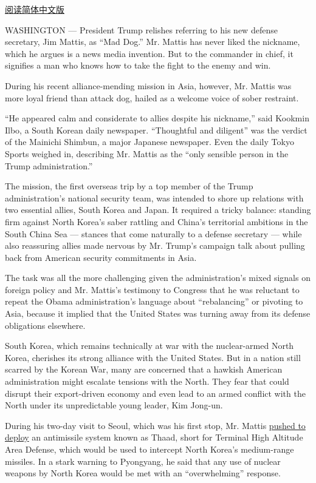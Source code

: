\href{http://cn.nytimes.com/asia-pacific/20170206/jim-mattis-south-korea-japan/}{阅读简体中文版}

WASHINGTON --- President Trump relishes referring to his new defense
secretary, Jim Mattis, as ``Mad Dog.'' Mr. Mattis has never liked the
nickname, which he argues is a news media invention. But to the
commander in chief, it signifies a man who knows how to take the fight
to the enemy and win.

During his recent alliance-mending mission in Asia, however, Mr. Mattis
was more loyal friend than attack dog, hailed as a welcome voice of
sober restraint.

``He appeared calm and considerate to allies despite his nickname,''
said Kookmin Ilbo, a South Korean daily newspaper. ``Thoughtful and
diligent'' was the verdict of the Mainichi Shimbun, a major Japanese
newspaper. Even the daily Tokyo Sports weighed in, describing Mr. Mattis
as the ``only sensible person in the Trump administration.''

The mission, the first overseas trip by a top member of the Trump
administration's national security team, was intended to shore up
relations with two essential allies, South Korea and Japan. It required
a tricky balance: standing firm against North Korea's saber rattling and
China's territorial ambitions in the South China Sea --- stances that
come naturally to a defense secretary --- while also reassuring allies
made nervous by Mr. Trump's campaign talk about pulling back from
American security commitments in Asia.

The task was all the more challenging given the administration's mixed
signals on foreign policy and Mr. Mattis's testimony to Congress that he
was reluctant to repeat the Obama administration's language about
``rebalancing'' or pivoting to Asia, because it implied that the United
States was turning away from its defense obligations elsewhere.

South Korea, which remains technically at war with the nuclear-armed
North Korea, cherishes its strong alliance with the United States. But
in a nation still scarred by the Korean War, many are concerned that a
hawkish American administration might escalate tensions with the North.
They fear that could disrupt their export-driven economy and even lead
to an armed conflict with the North under its unpredictable young
leader, Kim Jong-un.

During his two-day visit to Seoul, which was his first stop, Mr. Mattis
\href{https://www.nytimes.com/2017/02/02/world/asia/james-mattis-us-korea-thaad.html}{pushed
to deploy} an antimissile system known as Thaad, short for Terminal High
Altitude Area Defense, which would be used to intercept North Korea's
medium-range missiles. In a stark warning to Pyongyang, he said that any
use of nuclear weapons by North Korea would be met with an
``overwhelming'' response.

